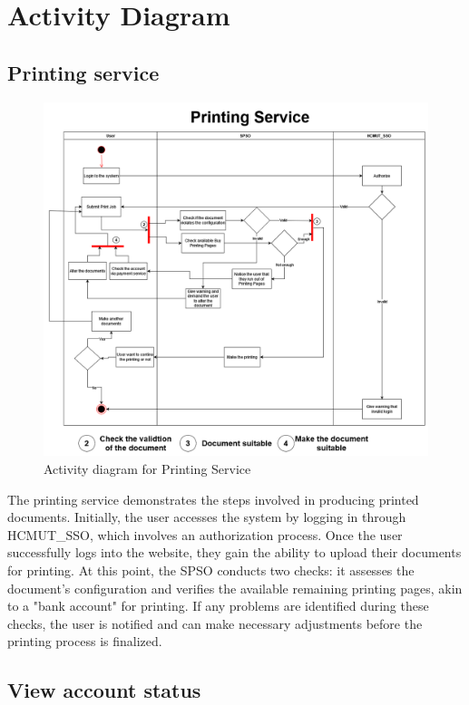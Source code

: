 \section{Activity Diagram}

\subsection{Printing service}
\begin{figure}[H]
\centering
  \includegraphics[max width=0.9\linewidth,origin = c]{chapters/4. system-modeling/activity/activity_printing.drawio.png}
  \caption{Activity diagram for Printing Service}%
\end{figure}

The printing service demonstrates the steps involved in producing printed documents. Initially, the user accesses the system by logging in through HCMUT\_SSO, which involves an authorization process. Once the user successfully logs into the website, they gain the ability to upload their documents for printing. At this point, the SPSO conducts two checks: it assesses the document's configuration and verifies the available remaining printing pages, akin to a "bank account" for printing. If any problems are identified during these checks, the user is notified and can make necessary adjustments before the printing process is finalized.

\subsection{View account status}

